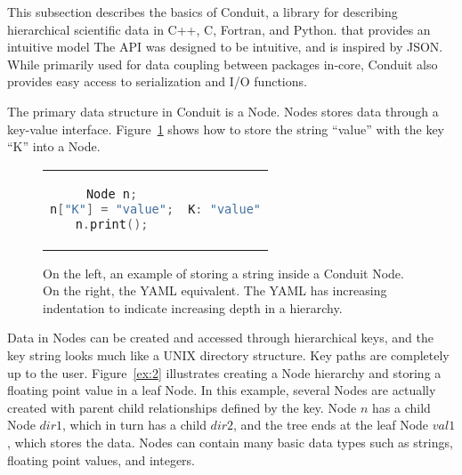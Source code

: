 This subsection describes the basics of Conduit, a library for describing 
hierarchical scientific data in C++, C, Fortran, and Python.
%
that provides an intuitive model 
The API was designed to be intuitive, and is inspired by JSON.
%
While primarily used for data coupling between packages in-core,
Conduit also provides easy access to serialization and I/O functions.
%
%

The primary data structure in Conduit is a Node.
%
Nodes stores data through a key-value interface.
%
Figure~\ref{ex:1} shows how to store the string ``value'' with the key ``K'' into a Node.

\begin{figure}
\begin{tabular}{cc}
  \begin{minipage}{.5\textwidth}
  \centering
    \begin{lstlisting}[language=C++]
Node n;
n["K"] = "value";
n.print();
    \end{lstlisting}
  \end{minipage}
  &
  \begin{minipage}{.5\textwidth}
  \centering
  \begin{lstlisting}[language=C++]
K: "value"
  \end{lstlisting}
  \end{minipage}
\end{tabular}
\caption{\label{ex:1}On the left, an example of storing a string inside a Conduit Node. On the right, the YAML equivalent.  The YAML has increasing indentation to indicate increasing depth in a hierarchy.}
\end{figure}

Data in Nodes can be created and accessed through hierarchical keys,
and the key string looks much like a UNIX directory structure.
%
Key paths are completely up to the user.
%
Figure~\ref{ex:2} illustrates creating a Node hierarchy
and storing a floating point value in a leaf Node.
%
In this example, several Nodes are actually created with parent child
relationships defined by the key.
%
Node $n$ has a child Node $dir1$, which in turn has a child $dir2$,
and the tree ends at the leaf Node $val1$, which stores the data.
%
Nodes can contain many basic data types such as strings,
floating point values, and integers.


